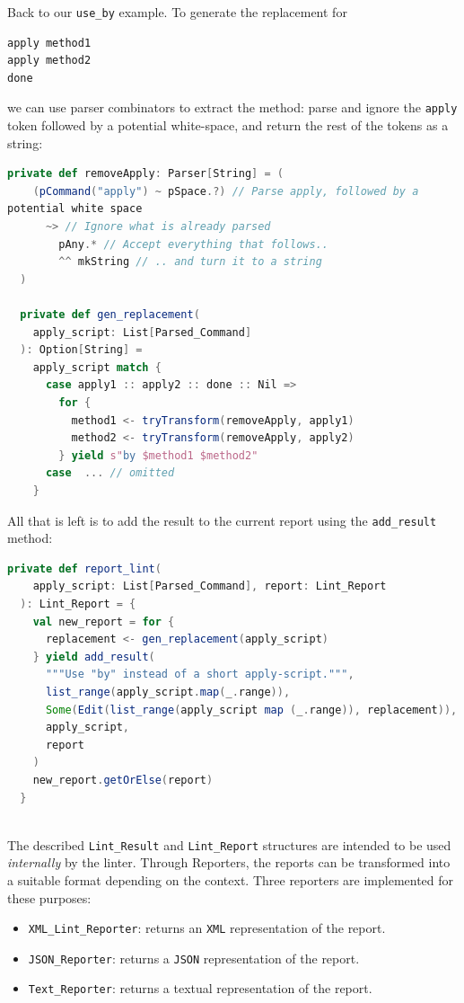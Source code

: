 Back to our \texttt{use\_by} example. To generate the replacement for
\begin{lstlisting}
apply method1
apply method2
done
\end{lstlisting}
we can use parser combinators to extract the method: parse and ignore the
\texttt{apply} token followed by a potential white-space, and return the rest of
the tokens as a string:
\begin{lstlisting}[language=scala]
  private def removeApply: Parser[String] = (
    (pCommand("apply") ~ pSpace.?) // Parse apply, followed by a 
potential white space
      ~> // Ignore what is already parsed
        pAny.* // Accept everything that follows..
        ^^ mkString // .. and turn it to a string
  )
    
  private def gen_replacement(
    apply_script: List[Parsed_Command]
  ): Option[String] =
    apply_script match {
      case apply1 :: apply2 :: done :: Nil =>
        for {
          method1 <- tryTransform(removeApply, apply1)
          method2 <- tryTransform(removeApply, apply2)
        } yield s"by $method1 $method2"
      case  ... // omitted
    }

\end{lstlisting}
All that is left is to add the result to the current report using the 
\texttt{add\_result} method:
\begin{lstlisting}[language=scala]
  private def report_lint(
    apply_script: List[Parsed_Command], report: Lint_Report
  ): Lint_Report = {
    val new_report = for {
      replacement <- gen_replacement(apply_script)
    } yield add_result(
      """Use "by" instead of a short apply-script.""",
      list_range(apply_script.map(_.range)),
      Some(Edit(list_range(apply_script map (_.range)), replacement)),
      apply_script,
      report
    )
    new_report.getOrElse(report)
  }
  
\end{lstlisting}

The described \texttt{Lint\_Result} and \texttt{Lint\_Report} structures
are intended to be used \textit{internally} by 
the linter. Through Reporters, the reports can be transformed into a suitable format
depending on the context. Three reporters are implemented for these purposes:

\begin{itemize}
    \item \texttt{XML\_Lint\_Reporter}: returns an \texttt{XML}
    representation of the report.
    \item \texttt{JSON\_Reporter}: returns a \texttt{JSON} 
    representation of the report.
    \item \texttt{Text\_Reporter}: returns a textual representation
    of the report.
\end{itemize}

